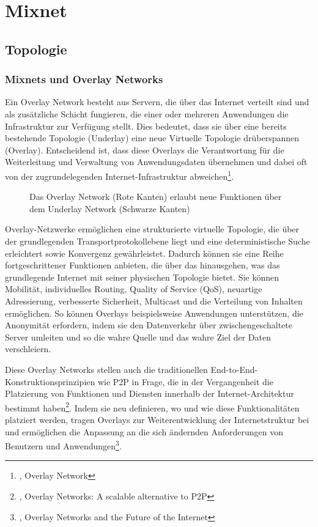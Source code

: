 \section{Mixnet}

\subsection{Topologie}

\subsubsection{Mixnets und Overlay Networks}

Ein Overlay Network besteht aus Servern, die über das Internet verteilt sind und als zusätzliche Schicht fungieren, die einer oder mehreren Anwendungen die Infrastruktur zur Verfügung stellt. Dies bedeutet, dass sie über eine bereits bestehende Topologie (Underlay) eine neue Virtuelle Topologie drüberspannen (Overlay). Entscheidend ist, dass diese Overlays die Verantwortung für die Weiterleitung und Verwaltung von Anwendungsdaten übernehmen und dabei oft von der zugrundelegenden Internet-Infrastruktur abweichen\footnote{\cite{OverlayNetwork}, Overlay Network}.

\begin{figure}[h!]
    \centering
    
    \caption{Das Overlay Network (Rote Kanten) erlaubt neue Funktionen über dem Underlay Network (Schwarze Kanten)}
    \label{imgs:overlay_network}
\end{figure}

Overlay-Netzwerke ermöglichen eine strukturierte virtuelle Topologie, die über der grundlegenden Transportprotokollebene liegt und eine deterministische Suche erleichtert sowie Konvergenz gewährleistet. Dadurch können sie eine Reihe fortgeschrittener Funktionen anbieten, die über das hinausgehen, was das grundlegende Internet mit seiner physischen Topologie bietet. Sie können Mobilität, individuelles Routing, Quality of Service (QoS), neuartige Adressierung, verbesserte Sicherheit, Multicast und die Verteilung von Inhalten ermöglichen. So können Overlays beispielsweise Anwendungen unterstützen, die Anonymität erfordern, indem sie den Datenverkehr über zwischengeschaltete Server umleiten und so die wahre Quelle und das wahre Ziel der Daten verschleiern.

Diese Overlay Networks stellen auch die traditionellen End-to-End-Konstruktionsprinzipien wie P2P in Frage, die in der Vergangenheit die Platzierung von Funktionen und Diensten innerhalb der Internet-Architektur bestimmt haben\footnote{\cite{AlternativeToP2P}, Overlay Networks: A scalable alternative to P2P}. Indem sie neu definieren, wo und wie diese Funktionalitäten platziert werden, tragen Overlays zur Weiterentwicklung der Internetstruktur bei und ermöglichen die Anpassung an die sich ändernden Anforderungen von Benutzern und Anwendungen\footnote{\cite{FutureOfTheInternet}, Overlay Networks and the Future of the Internet}.

